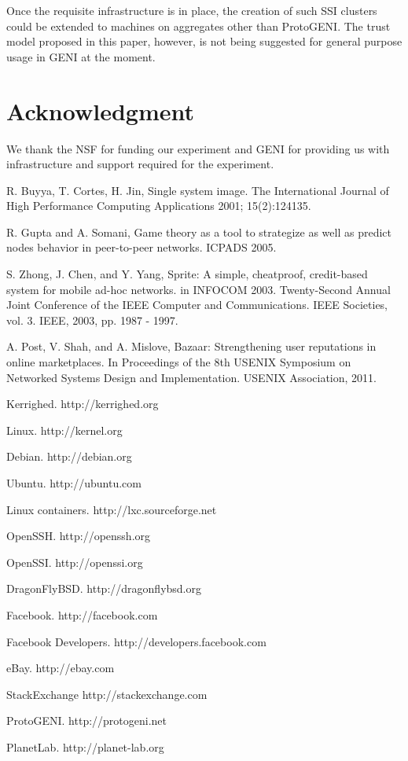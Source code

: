 \documentclass[10pt, conference, compsocconf]{IEEEtran}
\begin{document}
Once the requisite infrastructure is in place,
the creation of such SSI clusters could be extended to
machines on aggregates other than ProtoGENI.
The trust model proposed in this paper, however, is not being
suggested for general purpose usage in GENI at the moment.

\section{Acknowledgment}
\label{sec:Acknowledgment}
We thank the NSF for funding our experiment and GENI
for providing us with infrastructure and support required for the experiment.


\begin{thebibliography}{18}

R. Buyya, T. Cortes, H. Jin, Single system image. The International
Journal of High Performance Computing Applications 2001; 15(2):124135.

R. Gupta and A. Somani, Game theory as a tool to strategize
as well as predict nodes behavior in peer-to-peer networks. ICPADS 2005.

S. Zhong, J. Chen, and Y. Yang, Sprite: A simple, cheatproof,
credit-based system for mobile ad-hoc networks. in INFOCOM 2003.
Twenty-Second Annual Joint Conference of the IEEE Computer
and Communications. IEEE Societies, vol. 3. IEEE, 2003, pp.
1987 - 1997.

A. Post, V. Shah, and A. Mislove, Bazaar: Strengthening user
reputations in online marketplaces. In Proceedings of the
8th USENIX Symposium on Networked Systems Design and
Implementation. USENIX Association, 2011.

Kerrighed. http://kerrighed.org

Linux. http://kernel.org

Debian. http://debian.org

Ubuntu. http://ubuntu.com

Linux containers. http://lxc.sourceforge.net

OpenSSH. http://openssh.org

OpenSSI. http://openssi.org

DragonFlyBSD. http://dragonflybsd.org

Facebook. http://facebook.com

Facebook Developers. http://developers.facebook.com

eBay. http://ebay.com

StackExchange http://stackexchange.com

ProtoGENI. http://protogeni.net

PlanetLab. http://planet-lab.org


\end{thebibliography}
\end{document}
